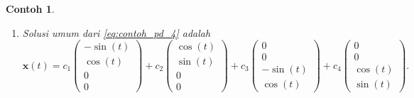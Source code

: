 \documentclass[a4paper]{article}
\theoremstyle{definisi}
\newtheorem{contoh}{Contoh}[subsection]
\numberwithin{equation}{section}
\begin{document}
\begin{contoh}
\begin{enumerate}[label=Langkah \arabic*: ,leftmargin=*]
\begin{equation}
\begin{split}
        \end{split}
      \end{equation}
      \item Solusi umum dari \eqref{eq:contoh_pd_4} adalah 
      \[\mathbf{x}(t) = c_1\begin{pmatrix}-\sin(t)\\ \cos(t)\\0\\0\end{pmatrix} + c_2\begin{pmatrix}\cos(t)\\ \sin(t)\\0\\0\end{pmatrix} + c_3\begin{pmatrix}0\\0\\-\sin(t)\\ \cos(t)\end{pmatrix} + c_4\begin{pmatrix}0\\0\\ \cos(t)\\ \sin(t)\end{pmatrix}.\]
    \end{enumerate}
  \end{contoh}
\end{document}
